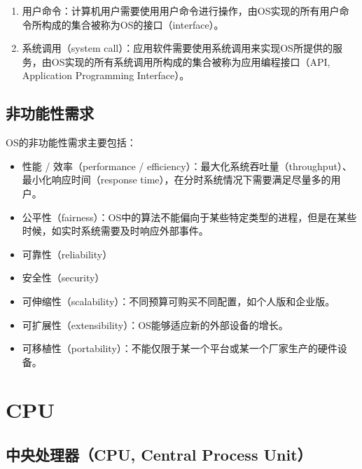 \begin{enumerate}
	\item 用户命令：计算机用户需要使用用户命令进行操作，由OS实现的所有用户命令所构成的集合被称为OS的接口（interface）。

	\item 系统调用（system call）：应用软件需要使用系统调用来实现OS所提供的服务，由OS实现的所有系统调用所构成的集合被称为应用编程接口（API, Application Programming Interface）。
\end{enumerate}

\subsection{非功能性需求}

OS的非功能性需求主要包括：

\begin{itemize}
	\item 性能 / 效率（performance / efficiency）：最大化系统吞吐量（throughput）、最小化响应时间（response time），在分时系统情况下需要满足尽量多的用户。

	\item 公平性（fairness）：OS中的算法不能偏向于某些特定类型的进程，但是在某些时候，如实时系统需要及时响应外部事件。

	\item 可靠性（reliability）

	\item 安全性（security）

	\item 可伸缩性（scalability）：不同预算可购买不同配置，如个人版和企业版。

	\item 可扩展性（extensibility）：OS能够适应新的外部设备的增长。

	\item 可移植性（portability）：不能仅限于某一个平台或某一个厂家生产的硬件设备。
\end{itemize}

\newpage

\section{CPU}

\subsection{中央处理器（CPU, Central Process Unit）}

